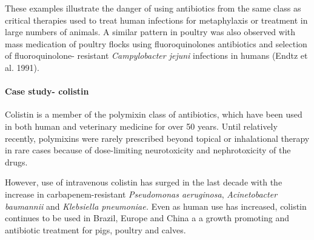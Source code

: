 \documentclass[]{tufte-handout}
\begin{document}
These examples illustrate the danger of using antibiotics from the same
class as critical therapies used to treat human infections for
metaphylaxis or treatment in large numbers of animals. A similar pattern
in poultry was also observed with mass medication of poultry flocks
using fluoroquinolones antibiotics and selection of fluoroquinolone-
resistant \emph{Campylobacter jejuni} infections in humans (Endtz et al.
1991).

\hypertarget{case-study--colistin}{%
\paragraph*{Case study- colistin}\label{case-study--colistin}}

Colistin is a member of the polymixin class of antibiotics, which have
been used in both human and veterinary medicine for over 50 years. Until
relatively recently, polymixins were rarely prescribed beyond topical or
inhalational therapy in rare cases because of dose-limiting
neurotoxicity and nephrotoxicity of the drugs.

However, use of intravenous colistin has surged in the last decade with
the increase in carbapenem-resistant \emph{Pseudomonas aeruginosa},
\emph{Acinetobacter baumannii} and \emph{Klebsiella pneumoniae.} Even as
human use has increased, colistin continues to be used in Brazil, Europe
and China a a growth promoting and antibiotic treatment for pigs,
poultry and calves.
\end{document}
